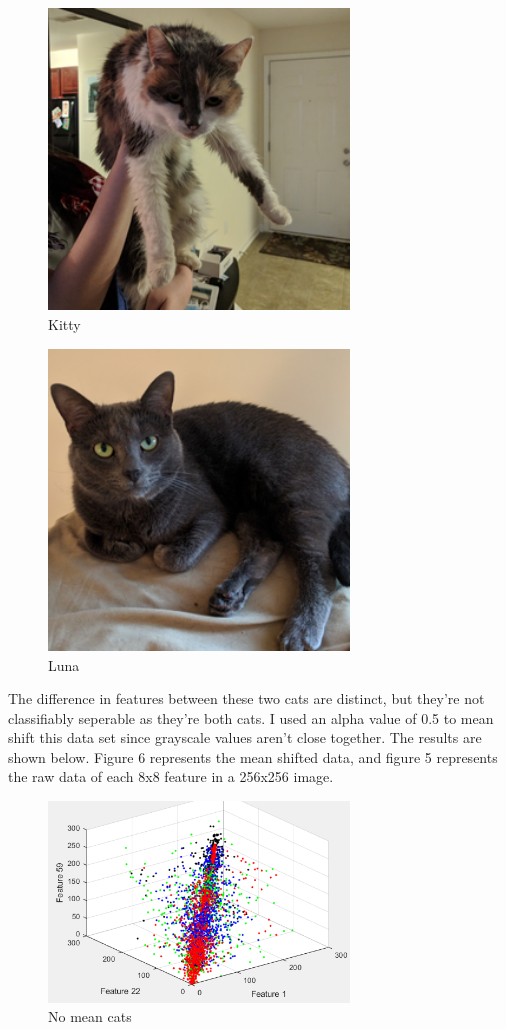 \documentclass[12pt, letterpaper]{article}
\begin{document}
\begin{figure}[H]
\centering
\includegraphics[width=8cm]{kitty2}
\caption{Kitty}
\label{fig:kitty}
\end{figure}


\begin{figure}[H]
\centering
\includegraphics[width=8cm]{luna2}
\caption{{Luna}}
\label{fig:luna}
\end{figure}

The difference in features between these two cats are distinct, but they're not classifiably seperable as they're both cats.
I used an alpha value of 0.5 to mean shift this data set since grayscale values aren't close together. The results are shown below. Figure 6 represents the mean shifted data, and figure 5 represents the raw data of each 8x8 feature in a 256x256 image.

\begin{figure}[H]
\centering
\includegraphics[width=8cm]{nomean}
\caption{{No mean cats}}
\label{fig:nmc}
\end{figure}
\end{document}
